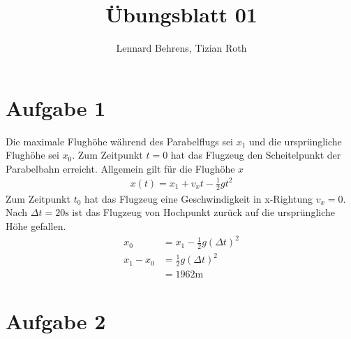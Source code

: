 \documentclass[a4paper,11pt]{article}
\title{Übungsblatt 01}
\author{Lennard Behrens, Tizian Roth}
\begin{document}
\maketitle

\section*{Aufgabe 1}
Die maximale Flughöhe während des Parabelflugs sei $x_1$ und die ursprüngliche Flughöhe sei $x_0$. Zum Zeitpunkt $t=0$ hat das Flugzeug den Scheitelpunkt der Parabelbahn erreicht. Allgemein gilt für die Flughöhe $x$
\begin{align*}
  x(t) = x_1 + v_xt- \frac{1}{2} g t^2
\end{align*} 
Zum Zeitpunkt $t_0$ hat das Flugzeug eine Geschwindigkeit in x-Rightung $v_x=0$. Nach $\Delta t = 20 \mbox{s}$ ist das Flugzeug von Hochpunkt zurück auf die ursprüngliche Höhe gefallen. 
\begin{align*}
  x_0 &= x_1 - \frac{1}{2} g (\Delta t)^2 \\
  x_1 - x_0 &= \frac{1}{2} g (\Delta t)^2 \\
  &= 1962 \mbox{m}
\end{align*}

\section*{Aufgabe 2}
\end{document}
